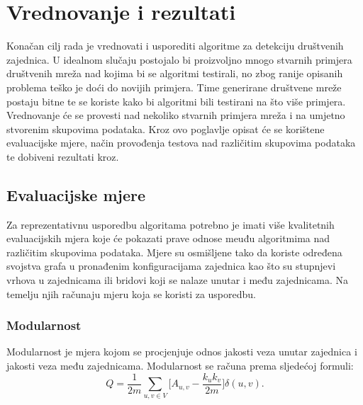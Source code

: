 \documentclass[times, utf8, diplomski]{fer}
\begin{document}
%
\chapter{Vrednovanje i rezultati} \label{vrednovanja_i_rezultati}

Konačan cilj rada je vrednovati i usporediti algoritme za detekciju društvenih zajednica. U idealnom slučaju postojalo bi proizvoljno mnogo stvarnih primjera društvenih mreža nad kojima bi se algoritmi testirali, no zbog ranije opisanih problema teško je doći do novijih primjera. Time generirane društvene mreže postaju bitne te se koriste kako bi algoritmi bili testirani na što više primjera. Vrednovanje će se provesti nad nekoliko stvarnih primjera mreža i na umjetno stvorenim skupovima podataka. Kroz ovo poglavlje opisat će se korištene evaluacijske mjere, način provođenja testova nad različitim skupovima podataka te dobiveni rezultati kroz.

\section{Evaluacijske mjere}
Za reprezentativnu usporedbu algoritama potrebno je imati više kvalitetnih evaluacijskih mjera koje će pokazati prave odnose meuđu algoritmima nad različitim skupovima podataka. Mjere su osmišljene tako da koriste određena svojstva grafa u  pronađenim konfiguracijama zajednica kao što su stupnjevi vrhova u zajednicama ili bridovi koji se nalaze unutar i među zajednicama. Na temelju njih računaju mjeru koja se koristi za usporedbu. 


\subsection{Modularnost}
Modularnost je mjera kojom se procjenjuje odnos jakosti veza unutar zajednica i jakosti veza među zajednicama. Modularnost se računa prema sljedećoj formuli:
\begin{equation}
	Q = \frac{1}{2m} \sum_{u,v \in V} \bigg[ A_{u,v} - \frac{k_{u}k_{v}}{2m} \bigg] \delta(u,v).
\end{equation}
\end{document}
